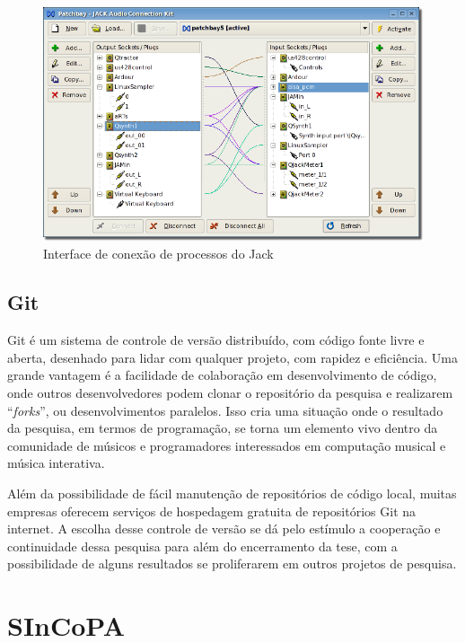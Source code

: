 \documentclass{ppgmus}
\begin{document}
\begin{figure}
\includegraphics[scale=.7]{qjackctl}
\caption{Interface de conexão de processos do Jack}
\label{jack}
\end{figure}




\section{Git}

Git é um sistema de controle de versão distribuído, com código fonte livre e aberta, desenhado para lidar com qualquer
projeto, com rapidez e eficiência.
Uma grande vantagem é a facilidade de colaboração em desenvolvimento de código, onde outros desenvolvedores
podem clonar o repositório da pesquisa e realizarem ``\textit{forks}'', ou desenvolvimentos paralelos. Isso cria uma situação 
onde o resultado da pesquisa, em termos de programação, se torna um elemento vivo dentro da comunidade de músicos e 
programadores interessados em computação musical e música interativa.

Além da possibilidade de fácil manutenção de repositórios de código local, muitas empresas oferecem serviços de
hospedagem gratuita de repositórios Git na internet. A escolha desse controle de versão se dá pelo estímulo a cooperação e 
continuidade dessa pesquisa para além do encerramento da tese, com a possibilidade de alguns resultados se proliferarem
em outros projetos de pesquisa.



\newpage






\chapter{SInCoPA}
\label{chap:SInCoPA}
\end{document}
